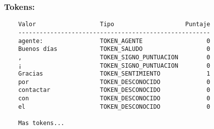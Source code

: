 \subsubsection*{Tokens:}
\begin{tcolorbox}[colback=gray!10, colframe=gray!80, sharp corners, boxrule=0.5pt]
\begin{verbatim}
	Valor                  Tipo                    Puntaje
	------------------------------------------------------
	agente:                TOKEN_AGENTE                  0
	Buenos días            TOKEN_SALUDO                  0
	,                      TOKEN_SIGNO_PUNTUACION        0
	¡                      TOKEN_SIGNO_PUNTUACION        0
	Gracias                TOKEN_SENTIMIENTO             1
	por                    TOKEN_DESCONOCIDO             0
	contactar              TOKEN_DESCONOCIDO             0
	con                    TOKEN_DESCONOCIDO             0
	el                     TOKEN_DESCONOCIDO             0

    Mas tokens...
\end{verbatim}
\end{tcolorbox}
